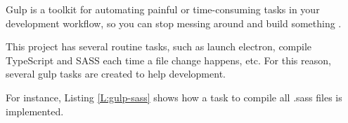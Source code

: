 Gulp is a toolkit for automating painful or time-consuming tasks in your
development workflow, so you can stop messing around and build something
\cite{gulp-web}.

This project has several routine tasks, such as launch electron, compile
TypeScript and SASS each time a file change happens, etc. For this reason, 
several gulp tasks are created to help development.

\begin{codefigure}
\end{codefigure}

For instance, Listing \ref{L:gulp-sass} shows how a task to compile all .sass 
files is implemented.
